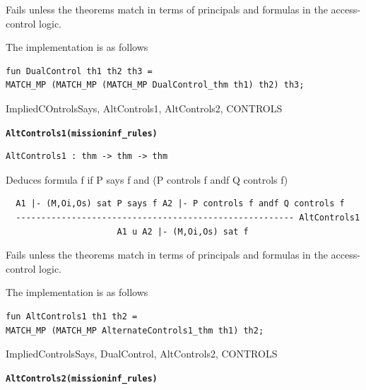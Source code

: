 \documentclass[10pt,twoside]{article}
\begin{document}
\FAILURE
Fails unless the theorems match in terms of principals and formulas
in the access-control logic.

\IMPLEMENTATION
The implementation is as follows
\begin{holboxed}
\begin{verbatim}
fun DualControl th1 th2 th3 =
MATCH_MP (MATCH_MP (MATCH_MP DualControl_thm th1) th2) th3;
\end{verbatim}
\end{holboxed}

\SEEALSO
ImpliedCOntrolsSays, AltControls1, AltControls2, CONTROLS
\ENDDOC

\begin{holboxed}
  \begin{Large}
    \texttt{\textbf{AltControls1}}\hfill{}\texttt{\textbf{(missioninf\_rules)}}
  \end{Large}
\end{holboxed}

\begin{verbatim}
AltControls1 : thm -> thm -> thm
\end{verbatim}

\SYNOPSIS 
Deduces formula f if P says f and (P controls f andf Q controls f)

\DESCRIBE

\begin{scriptsize}
\begin{verbatim}
  A1 |- (M,Oi,Os) sat P says f A2 |- P controls f andf Q controls f
  ------------------------------------------------------- AltControls1
                      A1 u A2 |- (M,Oi,Os) sat f
\end{verbatim}
\end{scriptsize}

\FAILURE
Fails unless the theorems match in terms of principals and formulas
in the access-control logic.

\IMPLEMENTATION
The implementation is as follows
\begin{holboxed}
\begin{verbatim}
fun AltControls1 th1 th2 =
MATCH_MP (MATCH_MP AlternateControls1_thm th1) th2;
\end{verbatim}
\end{holboxed}

\SEEALSO
ImpliedControlsSays, DualControl, AltControls2, CONTROLS
\ENDDOC

\begin{holboxed}
  \begin{Large}
    \texttt{\textbf{AltControls2}}\hfill{}\texttt{\textbf{(missioninf\_rules)}}
  \end{Large}
\end{holboxed}
\end{document}
